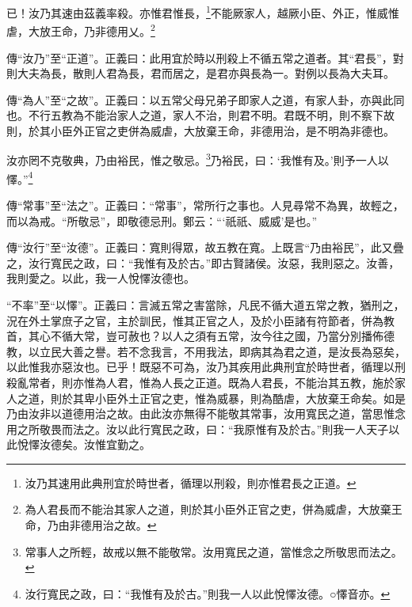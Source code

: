 已！汝乃其速由茲義率殺。亦惟君惟長，\footnote{汝乃其速用此典刑宜於時世者，循理以刑殺，則亦惟君長之正道。}不能厥家人，越厥小臣、外正，惟威惟虐，大放王命，乃非德用乂。\footnote{為人君長而不能治其家人之道，則於其小臣外正官之吏，併為威虐，大放棄王命，乃由非德用治之故。}


{\noindent\zhuan{}\fzbyks 傳“汝乃”至“正道”。正義曰：此用宜於時以刑殺上不循五常之道者。其“君長”，對則大夫為長，散則人君為長，君而居之，是君亦與長為一。對例以長為大夫耳。 \par}

{\noindent\zhuan{}\fzbyks 傳“為人”至“之故”。正義曰：以五常父母兄弟子即家人之道，有家人卦，亦與此同也。不行五教為不能治家人之道，家人不治，則君不明。君既不明，則不察下故則，於其小臣外正官之吏併為威虐，大放棄王命，非德用治，是不明為非德也。 \par}

汝亦罔不克敬典，乃由裕民，惟之敬忌。\footnote{常事人之所輕，故戒以無不能敬常。汝用寬民之道，當惟念之所敬思而法之。}乃裕民，曰：‘我惟有及。’則予一人以懌。”\footnote{汝行寬民之政，曰：“我惟有及於古。”則我一人以此悅懌汝德。○懌音亦。}

{\noindent\zhuan{}\fzbyks 傳“常事”至“法之”。正義曰：“常事”，常所行之事也。人見尋常不為異，故輕之，而以為戒。“所敬忌”，即敬德忌刑。鄭云：“‘祇祇、威威’是也。” \par}

{\noindent\zhuan{}\fzbyks 傳“汝行”至“汝德”。正義曰：寬則得眾，故五教在寬。上既言“乃由裕民”，此又疊之，汝行寬民之政，曰：“我惟有及於古。”即古賢諸侯。汝惡，我則惡之。汝善，我則愛之。以此，我一人悅懌汝德也。 \par}

{\noindent\shu{}\fzkt “不率”至“以懌”。正義曰：言滅五常之害當除，凡民不循大道五常之教，猶刑之，況在外土掌庶子之官，主於訓民，惟其正官之人，及於小臣諸有符節者，併為教首，其心不循大常，豈可赦也？以人之須有五常，汝今往之國，乃當分別播佈德教，以立民大善之譽。若不念我言，不用我法，即病其為君之道，是汝長為惡矣，以此惟我亦惡汝也。已乎！既惡不可為，汝乃其疾用此典刑宜於時世者，循理以刑殺亂常者，則亦惟為人君，惟為人長之正道。既為人君長，不能治其五教，施於家人之道，則於其卑小臣外土正官之吏，惟為威暴，則為酷虐，大放棄王命矣。如是乃由汝非以道德用治之故。由此汝亦無得不能敬其常事，汝用寬民之道，當思惟念用之所敬畏而法之。汝以此行寬民之政，曰：“我原惟有及於古。”則我一人天子以此悅懌汝德矣。汝惟宜勤之。 \par}

